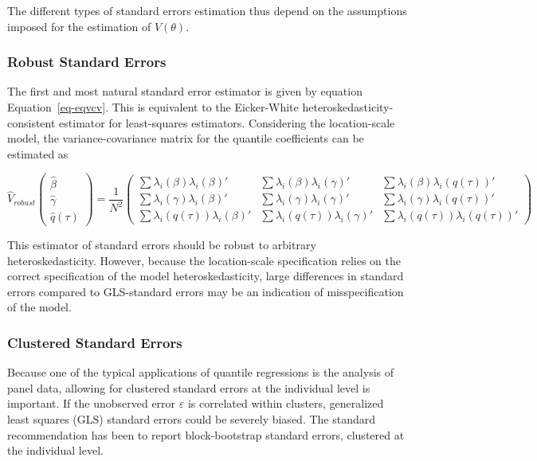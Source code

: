 \documentclass[
  authoryear,
  review,
  1p]{elsarticle}
\begin{document}
The different types of standard errors estimation thus depend on the
assumptions imposed for the estimation of \(V(\theta)\).

\hypertarget{robust-standard-errors}{%
\subsubsection{Robust Standard Errors}\label{robust-standard-errors}}

The first and most natural standard error estimator is given by equation
Equation~\ref{eq-eqvcv}. This is equivalent to the Eicker-White
heteroskedasticity-consistent estimator for least-squares estimators.
Considering the location-scale model, the variance-covariance matrix for
the quantile coefficients can be estimated as

\[\hat{V}_{robust}
  \begin{pmatrix}
  \hat\beta \\
  \hat\gamma \\
  \hat q(\tau)
  \end{pmatrix}
 = \frac{1}{N^2} 
 \begin{pmatrix}
 \sum \lambda_i(\beta) \lambda_i(\beta)' & \sum \lambda_i(\beta) \lambda_i(\gamma)' & \sum \lambda_i(\beta) \lambda_i(q(\tau))' \\
 \sum \lambda_i(\gamma) \lambda_i(\beta)' & \sum \lambda_i(\gamma) \lambda_i(\gamma)' & \sum \lambda_i(\gamma) \lambda_i(q(\tau))' \\
 \sum \lambda_i(q(\tau)) \lambda_i(\beta)' & \sum \lambda_i(q(\tau))\lambda_i(\gamma)' & \sum \lambda_i(q(\tau)) \lambda_i(q(\tau))' 
  \end{pmatrix}
\]

This estimator of standard errors should be robust to arbitrary
heteroskedasticity. However, because the location-scale specification
relies on the correct specification of the model heteroskedasticity,
large differences in standard errors compared to GLS-standard errors may
be an indication of misspecification of the model.

\hypertarget{clustered-standard-errors}{%
\subsubsection{Clustered Standard
Errors}\label{clustered-standard-errors}}

Because one of the typical applications of quantile regressions is the
analysis of panel data, allowing for clustered standard errors at the
individual level is important. If the unobserved error \(\varepsilon\)
is correlated within clusters, generalized least squares (GLS) standard
errors could be severely biased. The standard recommendation has been to
report block-bootstrap standard errors, clustered at the individual
level.
\end{document}
